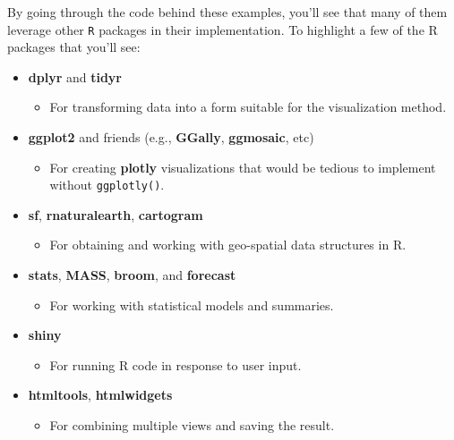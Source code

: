 \documentclass[
  12pt,
]{krantz}
\providecommand{\tightlist}{%
  \setlength{\itemsep}{0pt}\setlength{\parskip}{0pt}}
\begin{document}
By going through the code behind these examples, you'll see that many of them leverage other \texttt{R} packages in their implementation. To highlight a few of the R packages that you'll see:

\begin{itemize}
\tightlist
\item
  \textbf{dplyr} and \textbf{tidyr}

  \begin{itemize}
  \tightlist
  \item
    For transforming data into a form suitable for the visualization method.
  \end{itemize}
\item
  \textbf{ggplot2} and friends (e.g., \textbf{GGally}, \textbf{ggmosaic}, etc)

  \begin{itemize}
  \tightlist
  \item
    For creating \textbf{plotly} visualizations that would be tedious to implement without \texttt{ggplotly()}.
  \end{itemize}
\item
  \textbf{sf}, \textbf{rnaturalearth}, \textbf{cartogram}

  \begin{itemize}
  \tightlist
  \item
    For obtaining and working with geo-spatial data structures in R.
  \end{itemize}
\item
  \textbf{stats}, \textbf{MASS}, \textbf{broom}, and \textbf{forecast}

  \begin{itemize}
  \tightlist
  \item
    For working with statistical models and summaries.
  \end{itemize}
\item
  \textbf{shiny}

  \begin{itemize}
  \tightlist
  \item
    For running R code in response to user input.
  \end{itemize}
\item
  \textbf{htmltools}, \textbf{htmlwidgets}

  \begin{itemize}
  \tightlist
  \item
    For combining multiple views and saving the result.
  \end{itemize}
\end{itemize}
\end{document}

